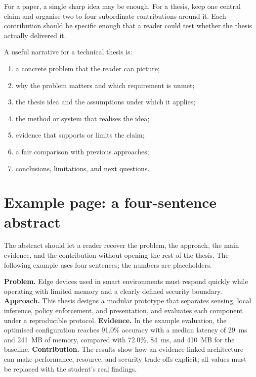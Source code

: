 \begin{keypoint}
For a paper, a single sharp idea may be enough. For a thesis, keep one central
claim and organise two to four subordinate contributions around it. Each
contribution should be specific enough that a reader could test whether the
thesis actually delivered it.
\end{keypoint}

A useful narrative for a technical thesis is:
\begin{enumerate}
  \item a concrete problem that the reader can picture;
  \item why the problem matters and which requirement is unmet;
  \item the thesis idea and the assumptions under which it applies;
  \item the method or system that realises the idea;
  \item evidence that supports or limits the claim;
  \item a fair comparison with previous approaches;
  \item conclusions, limitations, and next questions.
\end{enumerate}

\section{Example page: a four-sentence abstract}
The abstract should let a reader recover the problem, the approach, the main
evidence, and the contribution without opening the rest of the thesis. The
following example uses four sentences; the numbers are placeholders.

\begin{frontmatterbox}
\textbf{Problem.} Edge devices used in smart environments must respond quickly
while operating with limited memory and a clearly defined security boundary.
\textbf{Approach.} This thesis designs a modular prototype that separates
sensing, local inference, policy enforcement, and presentation, and evaluates
each component under a reproducible protocol. \textbf{Evidence.} In the example
evaluation, the optimised configuration reaches 91.0\% accuracy with a median
latency of 29~ms and 241~MB of memory, compared with 72.0\%, 84~ms, and 410~MB
for the baseline. \textbf{Contribution.} The results show how an evidence-linked
architecture can make performance, resource, and security trade-offs explicit;
all values must be replaced with the student's real findings.
\end{frontmatterbox}

